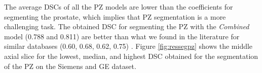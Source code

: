 The average DSCs of all the PZ models are lower than the coefficients for segmenting the prostate, which implies that PZ segmentation is a more challenging task. The obtained DSC for segmenting the PZ with the \emph{Combined} model (0.788 and 0.811) are better than what we found in the literature for similar databases (0.60, 0.68, 0.62, 0.75) \cite{mooij_automatic_2018,toth_simultaneous_2013, chilali_gland_2016, hutchison_pattern_2012}. Figure \ref{fig:ressegpz} shows the middle axial slice for the lowest, median, and highest DSC obtained for the segmentation of the PZ on the Siemens and GE dataset. 




